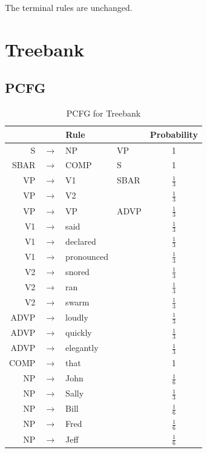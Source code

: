 \documentclass[11pt]{scrartcl}
\begin{document}
The terminal rules are unchanged.

\section{Treebank}

\subsection{PCFG}

\begin{table}[H]
\centering
\begin{tabular}{r c l l c}
\toprule
\multicolumn{4}{c}{Rule} & Probability \\
\midrule
S & $\rightarrow$ & NP & VP & 1 \\[2ex]
SBAR & $\rightarrow$ & COMP & S & 1 \\[2ex]
VP & $\rightarrow$ & V1 & SBAR & $\frac{1}{3}$ \\[2ex]
VP & $\rightarrow$ & V2 &  & $\frac{1}{3}$ \\[2ex]
VP & $\rightarrow$ & VP & ADVP & $\frac{1}{3}$ \\[2ex]
\midrule
V1 & $\rightarrow$ & said &  & $\frac{1}{3}$ \\[2ex]
V1 & $\rightarrow$ & declared &  & $\frac{1}{3}$ \\[2ex]
V1 & $\rightarrow$ & pronounced &  & $\frac{1}{3}$ \\[2ex]
V2 & $\rightarrow$ & snored &  & $\frac{1}{3}$ \\[2ex]
V2 & $\rightarrow$ & ran &  & $\frac{1}{3}$ \\[2ex]
V2 & $\rightarrow$ & swarm &  & $\frac{1}{3}$ \\[2ex]
ADVP & $\rightarrow$ & loudly &  & $\frac{1}{3}$ \\[2ex]
ADVP & $\rightarrow$ & quickly &  & $\frac{1}{3}$ \\[2ex]
ADVP & $\rightarrow$ & elegantly &  & $\frac{1}{3}$ \\[2ex]
COMP & $\rightarrow$ & that &  & 1 \\[2ex]
NP & $\rightarrow$ & John &  & $\frac{1}{6}$ \\[2ex]
NP & $\rightarrow$ & Sally &  & $\frac{1}{3}$ \\[2ex]
NP & $\rightarrow$ & Bill &  & $\frac{1}{6}$ \\[2ex]
NP & $\rightarrow$ & Fred &  & $\frac{1}{6}$ \\[2ex]
NP & $\rightarrow$ & Jeff &  & $\frac{1}{6}$ \\[2ex]
\bottomrule
\end{tabular}
\caption{PCFG for Treebank}
\label{table:pcfg_treebank}
\end{table}
\end{document}
